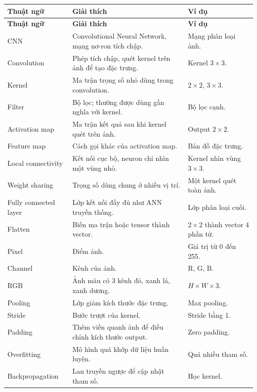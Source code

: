 \small
\begin{longtable}{p{}p{}p{}}
\toprule
\textbf{Thuật ngữ} & \textbf{Giải thích} & \textbf{Ví dụ} \\
\midrule
\endfirsthead

\toprule
\textbf{Thuật ngữ} & \textbf{Giải thích} & \textbf{Ví dụ} \\
\midrule
\endhead

CNN & Convolutional Neural Network, mạng nơ-ron tích chập. & Mạng phân loại ảnh. \\

Convolution & Phép tích chập, quét kernel trên ảnh để tạo đặc trưng. & Kernel $3\times3$. \\

Kernel & Ma trận trọng số nhỏ dùng trong convolution. & $2\times2$, $3\times3$. \\

Filter & Bộ lọc; thường được dùng gần nghĩa với kernel. & Bộ lọc cạnh. \\

Activation map & Ma trận kết quả sau khi kernel quét trên ảnh. & Output $2\times2$. \\

Feature map & Cách gọi khác của activation map. & Bản đồ đặc trưng. \\

Local connectivity & Kết nối cục bộ, neuron chỉ nhìn một vùng nhỏ. & Kernel nhìn vùng $3\times3$. \\

Weight sharing & Trọng số dùng chung ở nhiều vị trí. & Một kernel quét toàn ảnh. \\

Fully connected layer & Lớp kết nối đầy đủ như ANN truyền thống. & Lớp phân loại cuối. \\

Flatten & Biến ma trận hoặc tensor thành vector. & $2\times2$ thành vector 4 phần tử. \\

Pixel & Điểm ảnh. & Giá trị từ 0 đến 255. \\

Channel & Kênh của ảnh. & R, G, B. \\

RGB & Ảnh màu có 3 kênh đỏ, xanh lá, xanh dương. & $H\times W\times3$. \\

Pooling & Lớp giảm kích thước đặc trưng. & Max pooling. \\

Stride & Bước trượt của kernel. & Stride bằng 1. \\

Padding & Thêm viền quanh ảnh để điều chỉnh kích thước output. & Zero padding. \\

Overfitting & Mô hình quá khớp dữ liệu huấn luyện. & Quá nhiều tham số. \\

Backpropagation & Lan truyền ngược để cập nhật tham số. & Học kernel. \\

\bottomrule
\end{longtable}
\normalsize

